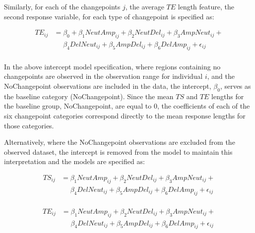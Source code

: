Similarly, for each of the changepoints ${j}$, the average $TE$ length feature, the second response variable, for each type of changepoint is specified as:

\begin{equation}
\begin{aligned}
TE_{ij}&=\beta_0+ \beta_1 NeutAmp_{ij} + \beta_2NeutDel_{ij}+ \beta_3AmpNeut_{ij} +  \\
       & \mathrel{\phantom{=}} \beta_4DelNeut_{ij}+ \beta_5AmpDel_{ij} + \beta_6DelAmp_{ij} + \epsilon_{ij}\\
\end{aligned}
\label{Eq1.1}
\end{equation}

In the above intercept model specification, where regions containing no changepoints are observed in the observation range for individual $i$, and the NoChangepoint observations are included in the data, the intercept, $\beta_0$, serves as the baseline category (NoChangepoint). Since the mean $TS$ and $TE$ lengths for the baseline group, NoChangepoint, are equal to 0, the coefficients of each of the six changepoint categories correspond directly to the mean response lengths for those categories. 

Alternatively, where the NoChangepoint observations are excluded from the observed dataset, the intercept is removed from the model to maintain this interpretation and the models are specified as: 

\begin{equation}
\begin{aligned}
TS_{ij}&=\beta_1 NeutAmp_{ij} + \beta_2NeutDel_{ij}+ \beta_3AmpNeut_{ij} +  \\
       & \mathrel{\phantom{=}} \beta_4DelNeut_{ij}+ \beta_5AmpDel_{ij} + \beta_6DelAmp_{ij} + \epsilon_{ij}\\
\end{aligned}
\label{Eq2}
\end{equation}

\begin{equation}
\begin{aligned}
TE_{ij}&= \beta_1 NeutAmp_{ij} + \beta_2NeutDel_{ij}+ \beta_3AmpNeut_{ij} +  \\
       & \mathrel{\phantom{=}} \beta_4DelNeut_{ij}+ \beta_5AmpDel_{ij} + \beta_6DelAmp_{ij} + \epsilon_{ij}\\
\end{aligned}
\label{Eq22}
\end{equation}

